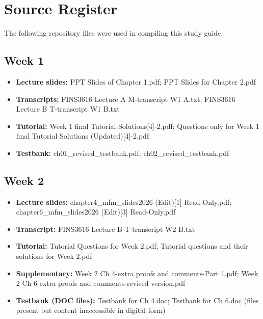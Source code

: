 \documentclass[11pt,a4paper]{article}
\begin{document}
\newpage

\section{Source Register}

{\sloppy
The following repository files were used in compiling this study guide.

\subsection*{Week 1}
\begin{itemize}
  \item \textbf{Lecture slides:} PPT Slides of Chapter 1.pdf; PPT Slides for Chapter 2.pdf
  \item \textbf{Transcripts:} FINS3616 Lecture A M-transcript W1 A.txt; FINS3616 Lecture B T-transcript W1 B.txt
  \item \textbf{Tutorial:} Week 1 final Tutorial Solutions[4]-2.pdf; Questions only for Week 1 final Tutorial Solutions (Updated)[4]-2.pdf
  \item \textbf{Testbank:} ch01\_revised\_testbank.pdf; ch02\_revised\_testbank.pdf
\end{itemize}

\subsection*{Week 2}
\begin{itemize}
  \item \textbf{Lecture slides:} chapter4\_mfm\_slides2026 (Edit)[1] Read-Only.pdf; chapter6\_mfm\_slides2026 (Edit)[3] Read-Only.pdf
  \item \textbf{Transcript:} FINS3616 Lecture B T-transcript W2 B.txt
  \item \textbf{Tutorial:} Tutorial Questions for Week 2.pdf; Tutorial questions and their solutions for Week 2.pdf
  \item \textbf{Supplementary:} Week 2 Ch 4-extra proofs and comments-Part 1.pdf; Week 2 Ch 6-extra proofs and comments-revised version.pdf
  \item \textbf{Testbank (DOC files):} Testbank for Ch 4.doc; Testbank for Ch 6.doc (files present but content inaccessible in digital form)
\end{itemize}

}
\end{document}
